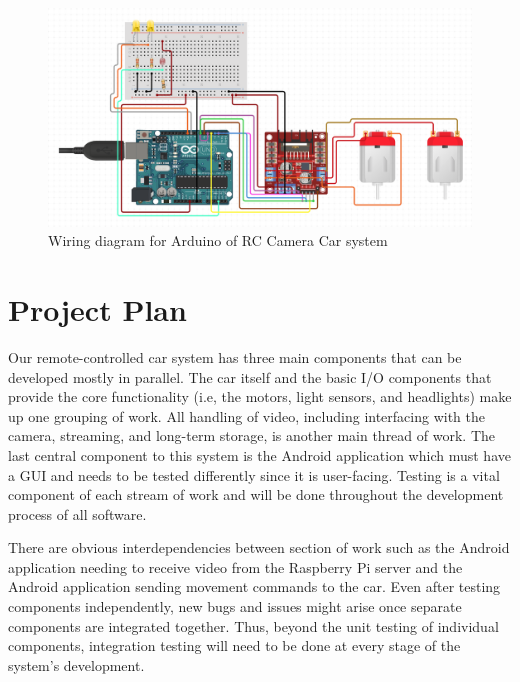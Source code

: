 \documentclass[letterpaper,12pt]{report}
\begin{document}
	\begin{figure}[H]
    	\centering
		\includegraphics[width=\linewidth]{Proposal_Wiring_Diagram.png}
    	\caption{Wiring diagram for Arduino of RC Camera Car system}
    	\label{fig:wiring}
	\end{figure}

	\section*{Project Plan}
	\markright{}
	Our remote-controlled car system has three main components that can be
	developed mostly in parallel. The car itself and the basic I/O components
	that provide the core functionality (i.e, the motors, light sensors, and
	headlights) make up one grouping of work. All handling of video, including
	interfacing with the camera, streaming, and long-term storage, is another
	main thread of work. The last central component to this system is the
	Android application which must have a GUI and needs to be tested
	differently since it is user-facing. Testing is a vital component of each
	stream of work and will be done throughout the development process of all
	software.

	There are obvious interdependencies between section of work such as the
	Android application needing to receive video from the Raspberry Pi server
	and the Android application sending movement commands to the car. Even
	after testing components independently, new bugs and issues might arise
	once separate components are integrated together. Thus, beyond the unit
	testing of individual components, integration testing will need to be done
	at every stage of the system’s development.
\end{document}
